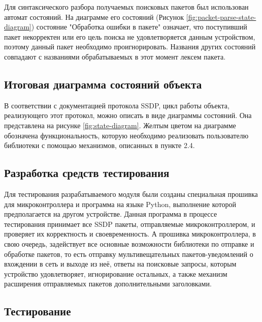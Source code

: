 Для синтаксического разбора получаемых поисковых пакетов был использован автомат состояний.
На диаграмме его состояний (Рисунок \ref{fig:packet-parse-state-diagram}) состояние "Обработка ошибки в пакете" означает, что поступивший пакет некорректен или его цель поиска не удовлетворяется данным устройством, поэтому данный пакет необходимо проигнорировать.
Названия других состояний совпадают с названиями обрабатываемых в этот момент лексем пакета.


\subsection{Итоговая диаграмма состояний объекта}

В соответствии с документацией протокола SSDP, цикл работы объекта, реализующего этот протокол, можно описать в виде диаграммы состояний.
Она представлена на рисунке \ref{fig:state-diagram}.
Желтым цветом на диаграмме обозначена функциональность, которую необходимо реализовать пользователю библиотеки с помощью механизмов, описанных в пункте 2.4.


\subsection{Разработка средств тестирования}

Для тестирования разрабатываемого модуля были созданы специальная прошивка для микроконтроллера и программа на языке Python, выполнение которой предполагается на другом устройстве.
Данная программа в процессе тестирования принимает все SSDP пакеты, отправляемые микроконтроллером, и проверяет их корректность и своевременность.
А прошивка микроконтроллера, в свою очередь, задействует все основные возможности библиотеки по отправке и обработке пакетов, то есть отправку мультивещательных пакетов-уведомлений о вхождении в сеть и выходе из неё, ответы на поисковые запросы, которым устройство удовлетворяет, игнорирование остальных, а также механизм расширения отправляемых пакетов дополнительными заголовками.

\subsection{Тестирование}

